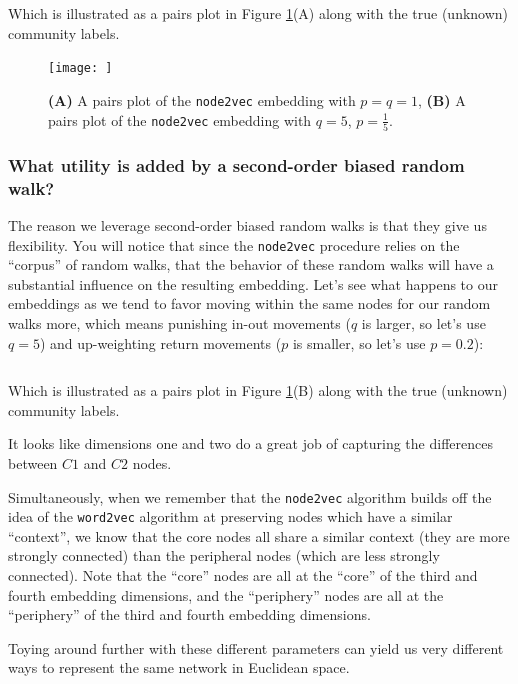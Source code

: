 Which is illustrated as a pairs plot in Figure \ref{fig:next:diff:embed}(A) along with the true (unknown) community labels. 

\begin{figure}
    \centering
    \texttt{[image: ]}
    \caption{\textbf{(A)} A pairs plot of the \texttt{node2vec} embedding with $p=q=1$, \textbf{(B)} A pairs plot of the \texttt{node2vec} embedding with $q = 5$, $p = \frac{1}{5}$.}
    \label{fig:next:diff:embed}
\end{figure}
\subsubsection*{What utility is added by a second-order biased random walk?}

The reason we leverage second-order biased random walks is that they give us flexibility. You will notice that since the \texttt{node2vec} procedure relies on the ``corpus'' of random walks, that the behavior of these random walks will have a substantial influence on the resulting embedding. Let's see what happens to our embeddings as we tend to favor moving within the same nodes for our random walks more, which means punishing in-out movements ($q$ is larger, so let's use $q=5$) and up-weighting return movements ($p$ is smaller, so let's use $p = 0.2$):

\begin{lstlisting}[style=python]
\end{lstlisting}

Which is illustrated as a pairs plot in Figure \ref{fig:next:diff:embed}(B) along with the true (unknown) community labels. 

It looks like dimensions one and two do a great job of capturing the differences between $C1$ and $C2$ nodes. 


Simultaneously, when we remember that the \texttt{node2vec} algorithm builds off the idea of the \texttt{word2vec} algorithm at preserving nodes which have a similar ``context'', we know that the core nodes all share a similar context (they are more strongly connected) than the peripheral nodes (which are less strongly connected). Note that the ``core'' nodes are all at the ``core'' of the third and fourth embedding dimensions, and the ``periphery'' nodes are all at the ``periphery'' of the third and fourth embedding dimensions.

Toying around further with these different parameters can yield us very different ways to represent the same network in Euclidean space.

